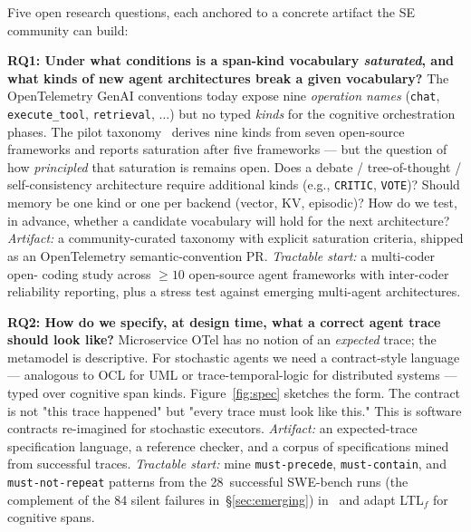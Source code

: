 \documentclass[10pt,conference]{IEEEtran}
\begin{document}
Five open research questions, each anchored to a concrete artifact
the SE community can build:

\textbf{RQ1: Under what conditions is a span-kind vocabulary
\emph{saturated}, and what kinds of new agent architectures break a
given vocabulary?}
The OpenTelemetry GenAI conventions today expose nine \emph{operation
names} (\texttt{chat}, \texttt{execute\_tool}, \texttt{retrieval},
$\ldots$) but no typed \emph{kinds} for the cognitive
orchestration phases. The pilot taxonomy~\cite{anon_taxonomy_2026}
derives nine kinds from seven open-source frameworks and reports
saturation after five frameworks --- but the question of how
\emph{principled} that saturation is remains open. Does a
debate / tree-of-thought / self-consistency architecture require
additional kinds (e.g., \texttt{CRITIC}, \texttt{VOTE})? Should
memory be one kind or one per backend (vector, KV, episodic)? How do
we test, in advance, whether a candidate vocabulary will hold for
the next architecture? \emph{Artifact:} a community-curated taxonomy
with explicit saturation criteria, shipped as an OpenTelemetry
semantic-convention PR. \emph{Tractable start:} a multi-coder open-
coding study across $\geq 10$ open-source agent frameworks with
inter-coder reliability reporting, plus a stress test against
emerging multi-agent architectures.

\textbf{RQ2: How do we specify, at design time, what a correct agent
trace should look like?}
Microservice OTel has no notion of an \emph{expected} trace; the
metamodel is descriptive. For stochastic agents we need a
contract-style language --- analogous to OCL for UML or
trace-temporal-logic for distributed systems --- typed over cognitive
span kinds. Figure~\ref{fig:spec} sketches the form. The contract is
not "this trace happened" but "every trace must look like this." This
is software contracts re-imagined for stochastic executors.
\emph{Artifact:} an expected-trace specification language, a
reference checker, and a corpus of specifications mined from
successful traces. \emph{Tractable start:} mine
\texttt{must-precede}, \texttt{must-contain}, and
\texttt{must-not-repeat} patterns from the 28~successful SWE-bench
runs (the complement of the 84 silent failures in~\S\ref{sec:emerging})
in~\cite{anon_sdk_2026} and adapt LTL$_f$ for cognitive spans.
\end{document}
